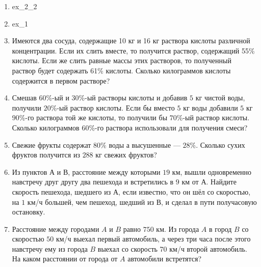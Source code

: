 \documentclass[12pt, a4paper]{article}
\begin{document}
	
	\begin{enumerate}
		\item {ex_2_2}
		\item {ex_1}
		\item Имеются два сосуда, содержащие 10 кг и 16 кг раствора кислоты различной концентрации. Если их слить вместе, то получится раствор, содержащий 55\% кислоты. Если же слить равные массы этих растворов, то полученный раствор будет содержать 61\% кислоты. Сколько килограммов кислоты содержится в первом растворе?
		\item Смешав $60\%$-ый и $30\%$-ый растворы кислоты и добавив $5$ кг чистой воды, получили $20\%$-ый раствор кислоты. Если бы вместо $5$ кг воды добавили $5$ кг $90\%$-го раствора той же кислоты, то получили бы $70\%$-ый раствор кислоты. Сколько килограммов $60\%$-го раствора использовали для получения смеси?
		\item Свежие фрукты содержат $80\%$ воды а высушенные --- $28\%$. Сколько сухих фруктов получится из $288$ кг свежих фруктов?
		\item Из пунктов $А$ и $В$, расстояние между которыми $19$ км, вышли одновременно навстречу друг другу два пешехода и встретились в $9$ км от $А$. Найдите скорость пешехода, шедшего из $А$, если известно, что он шёл со скоростью, на $1$ км/ч большей, чем пешеход, шедший из $В$, и сделал в пути получасовую остановку.
		\item Расстояние между городами $A$ и $B$ равно $750$ км. Из города $A$ в город $B$ со скоростью $50$ км/ч выехал первый автомобиль, а через три часа после этого навстречу ему из города $B$ выехал со скорость 70 км/ч второй автомобиль. На каком расстоянии от города от $A$ автомобили встретятся?
	\end{enumerate}
\end{document}
